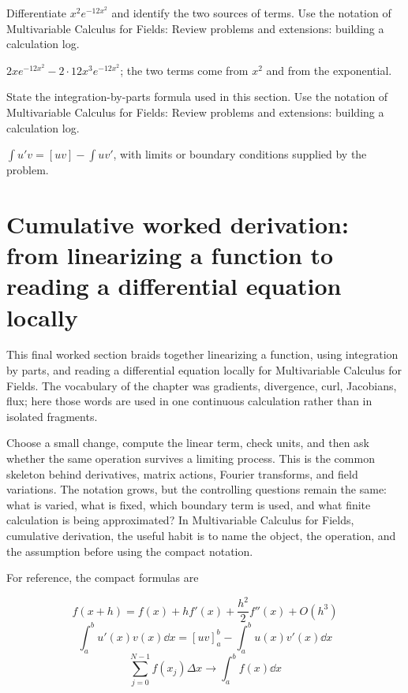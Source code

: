 \begin{exercise}
Differentiate \(x^2e^{-12x^2}\) and identify the two sources of terms.  Use the notation of Multivariable Calculus for Fields: Review problems and extensions: building a calculation log.
\begin{answer}
\(2xe^{-12x^2}-2\cdot 12x^3e^{-12x^2}\); the two terms come from \(x^2\) and from the exponential.
\end{answer}
\end{exercise}

\begin{exercise}
State the integration-by-parts formula used in this section.  Use the notation of Multivariable Calculus for Fields: Review problems and extensions: building a calculation log.
\begin{answer}
\(\int u'v=[uv]-\int uv'\), with limits or boundary conditions supplied by the problem.
\end{answer}
\end{exercise}



\section{Cumulative worked derivation: from linearizing a function to reading a differential equation locally}

This final worked section braids together linearizing a function, using integration by parts, and reading a differential equation locally for Multivariable Calculus for Fields.  The vocabulary of the chapter was gradients, divergence, curl, Jacobians, flux; here those words are used in one continuous calculation rather than in isolated fragments.

Choose a small change, compute the linear term, check units, and then ask whether the same operation survives a limiting process.  This is the common skeleton behind derivatives, matrix actions, Fourier transforms, and field variations.  The notation grows, but the controlling questions remain the same: what is varied, what is fixed, which boundary term is used, and what finite calculation is being approximated?  In Multivariable Calculus for Fields, cumulative derivation, the useful habit is to name the object, the operation, and the assumption before using the compact notation.

For reference, the compact formulas are

\[
  f(x+h)=f(x)+hf'(x)+\frac{h^2}{2}f''(x)+O(h^3)
\]
\[
  \int_a^b u'(x)v(x)\dd x=[uv]_a^b-\int_a^b u(x)v'(x)\dd x
\]
\[
  \sum_{j=0}^{N-1}f(x_j)\Delta x\longrightarrow \int_a^b f(x)\dd x
\]

